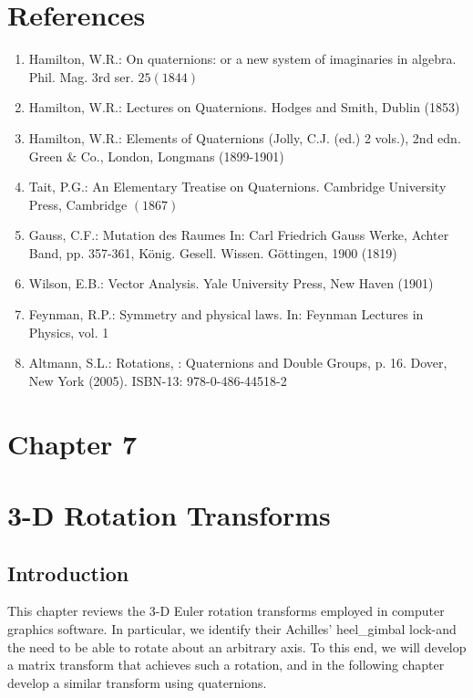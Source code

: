\documentclass[10pt]{article}
\begin{document}
\section{References}
\begin{enumerate}
  \item Hamilton, W.R.: On quaternions: or a new system of imaginaries in algebra. Phil. Mag. 3rd ser. $25(1844)$

  \item Hamilton, W.R.: Lectures on Quaternions. Hodges and Smith, Dublin (1853)

  \item Hamilton, W.R.: Elements of Quaternions (Jolly, C.J. (ed.) 2 vols.), 2nd edn. Green \& Co., London, Longmans (1899-1901)

  \item Tait, P.G.: An Elementary Treatise on Quaternions. Cambridge University Press, Cambridge $(1867)$

  \item Gauss, C.F.: Mutation des Raumes In: Carl Friedrich Gauss Werke, Achter Band, pp. 357-361, König. Gesell. Wissen. Göttingen, 1900 (1819)

  \item Wilson, E.B.: Vector Analysis. Yale University Press, New Haven (1901)

  \item Feynman, R.P.: Symmetry and physical laws. In: Feynman Lectures in Physics, vol. 1

  \item Altmann, S.L.: Rotations, : Quaternions and Double Groups, p. 16. Dover, New York (2005). ISBN-13: 978-0-486-44518-2

\end{enumerate}

\section{Chapter 7}
\section{3-D Rotation Transforms}
\subsection{Introduction}
This chapter reviews the 3-D Euler rotation transforms employed in computer graphics software. In particular, we identify their Achilles' heel\_gimbal lock-and the need to be able to rotate about an arbitrary axis. To this end, we will develop a matrix transform that achieves such a rotation, and in the following chapter develop a similar transform using quaternions.
\end{document}
